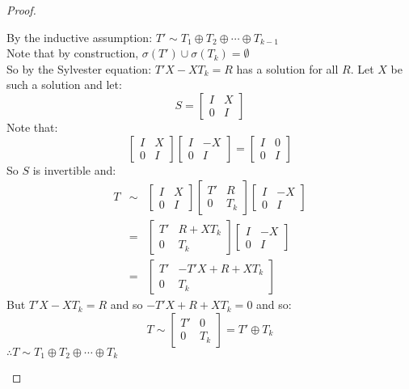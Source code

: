 \documentclass[letterpaper,12pt,fleqn]{article}
\renewcommand{\o}{\sigma}
\begin{document}
\begin{proof}
\begin{description}
    By the inductive assumption: $T'\sim T_1\oplus T_2\oplus\cdots\oplus T_{k-1}$ \\
    Note that by construction, $\o(T')\cup\o(T_k)=\emptyset$ \\
    So by the Sylvester equation: $T'X-XT_k=R$ has a solution for all $R$.
    Let $X$ be such a solution and let:
    \[S=\begin{bmatrix} I & X \\ 0 & I \end{bmatrix}\]
    Note that:
    \[\begin{bmatrix} I & X \\ 0 & I \end{bmatrix}
    \begin{bmatrix} I & -X \\ 0 & I \end{bmatrix}=
    \begin{bmatrix} I & 0 \\ 0 & I \end{bmatrix}\]
    So $S$ is invertible and:
    \begin{eqnarray*}
      T &\sim& \begin{bmatrix} I & X \\ 0 & I \end{bmatrix}
      \begin{bmatrix} T' & R \\ 0 & T_k \end{bmatrix}
      \begin{bmatrix} I & -X \\ 0 & I \end{bmatrix} \\
      &=& \begin{bmatrix} T' & R+XT_k \\ 0 & T_k \end{bmatrix}
      \begin{bmatrix} I & -X \\ 0 & I \end{bmatrix} \\
      &=& \begin{bmatrix} T' & -T'X+R+XT_k \\ 0 & T_k \end{bmatrix}
    \end{eqnarray*}
    But $T'X-XT_k=R$ and so $-T'X+R+XT_k=0$ and so:
    \[T\sim\begin{bmatrix} T' & 0 \\ 0 & T_k \end{bmatrix}=T'\oplus T_k\]
    $\therefore T\sim T_1\oplus T_2\oplus\cdots\oplus T_k$
  \end{description}
\end{proof}
\end{document}
